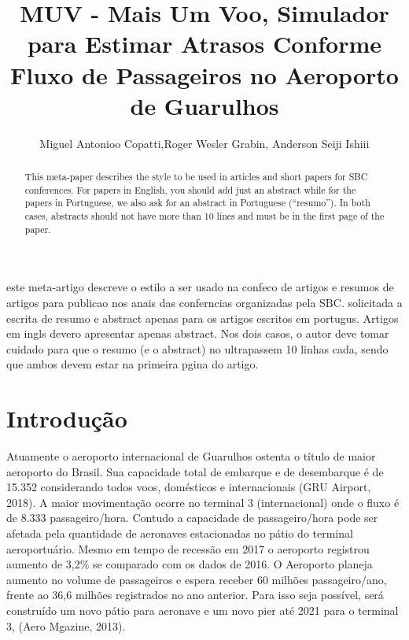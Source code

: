 \documentclass[12pt]{article}
\title{MUV - Mais Um Voo, Simulador para Estimar Atrasos Conforme Fluxo de
  Passageiros no Aeroporto de Guarulhos}
\author{Miguel Antonioo Copatti\inst{1},Roger Wesler Grabin\inst{2}, Anderson Seiji Ishiii\inst{3}}
\begin{document}
 

\maketitle

\begin{abstract}
  This meta-paper describes the style to be used in articles and short papers
  for SBC conferences. For papers in English, you should add just an abstract
  while for the papers in Portuguese, we also ask for an abstract in
  Portuguese (``resumo''). In both cases,   abstracts should not have more than
  10 lines and must be in the first page of the paper.
\end{abstract}
     
\begin{resumo} 


  este meta-artigo descreve o estilo a ser usado na confeco de artigos e
  resumos de artigos para publicao nos anais das conferncias organizadas
  pela SBC. solicitada a escrita de resumo e abstract apenas para os artigos
  escritos em portugus. Artigos em ingls devero apresentar apenas abstract.
  Nos dois casos, o autor deve tomar cuidado para que o resumo (e o abstract)
  no ultrapassem 10 linhas cada, sendo que ambos devem estar na primeira
  pgina do artigo.
\end{resumo}


\section{Introdução}

  Atuamente o aeroporto internacional de Guarulhos ostenta o título de maior
  aeroporto do Brasil. Sua capacidade total de embarque e de desembarque é
  de 15.352 considerando todos voos, domésticos e internacionais (GRU Airport, 2018).
  A maior movimentação ocorre no terminal 3 (internacional) onde o fluxo  é de
  8.333 passageiro/hora. Contudo a capacidade de passageiro/hora pode ser 
  afetada pela quantidade de aeronaves estacionadas no pátio do terminal
  aeroportuário. Mesmo em tempo de recessão em 2017 o aeroporto registrou 
  aumento de 3,2\% se comparado com os dados de 2016. O Aeroporto planeja
  aumento no volume de passageiros e espera receber 60 milhões passageiro/ano,
  frente ao 36,6 milhões registrados no ano anterior. Para isso seja possível,
  será construído um novo pátio para aeronave e um novo pier até 2021 para o 
  terminal 3, (Aero Mgazine, 2013).
\end{document}
